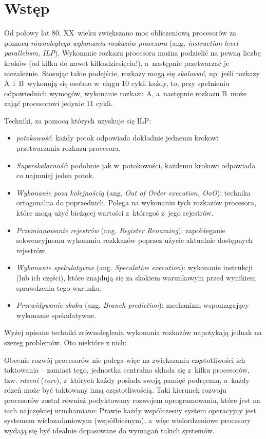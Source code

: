 \section{Wstęp}
%
\indent 
	Od połowy lat 80. XX~wieku zwiększano moc obliczeniową procesorów za pomocą \emph{równoległego wykonania rozkazów procesora}
	(ang. \emph{instruction-level parallelism, ILP}). Wykonanie rozkazu procesora można podzielić na pewną liczbę kroków
	(od kilku do nawet kilkudziesięciu!),	a~następnie przetwarzać je niezależnie. 
	Stosując takie podejście, rozkazy mogą się \emph{skalować}, np. jeśli rozkazy A~i~B~wykonują się osobno w~ciągu 10 cykli każdy, to,
	przy spełnieniu odpowiednich wymogów, wykonanie rozkazu A, a~następnie rozkazu B~może zająć procesorowi jedynie 11 cykli.
\par
%
\indent
	Techniki, za pomocą których uzyskuje się ILP:
	\begin{itemize}
	\item \emph{potokowość}: każdy potok odpowiada dokładnie jednemu krokowi przetwarzania rozkazu procesora.
	\item \emph{Superskalarność}: podobnie jak w~potokowości, każdemu krokowi odpowiada co najmniej jeden potok.
	\item \emph{Wykonanie poza kolejnością} (ang. \emph{Out of Order execution, OoO}): technika ortogonalna do poprzednich. Polega na 
		wykonaniu tych rozkazów procesora, które mogą użyć bieżącej wartości z~któregoś z~jego rejestrów.
	\item \emph{Przemianowanie rejestrów} (ang. \emph{Register Renaming}): zapobieganie sekwencyjnemu wykonaniu rozkkazów poprzez użycie 
		aktualnie dostępnych rejestrów.
	\item \emph{Wykonanie spekulatywne} (ang. \emph{Speculative execution}): wykonanie instrukcji (lub ich części), które znajdują się
		za skokiem warunkowym przed wynikiem sprawdzenia tego warunku.
	\item \emph{Przewidywanie skoku} (ang. \emph{Branch prediction}): mechanizm wspomagający wykonanie spekulatywne.
	\end{itemize}
\par
%
\indent
	Wyżej opisane techniki zrównoleglenia wykonania rozkazów napotykają jednak na szereg problemów. Oto niektóre z nich:
\par
%
\indent
	Obecnie rozwój procesorów nie polega więc na zwiększaniu częstotliwości ich taktowania -- zamiast tego, jednostka centralna
	składa się z~kilku procesorów, tzw. \emph{rdzeni} (\emph{core}), z~których każdy posiada swoją pamięć podręczną, a~każdy
	rdzeń może być taktowany inną częstotliwością.
	Taki kierunek rozwoju procesorów został również podyktowany rozwojem oprogramowania, które jest na nich najczęściej uruchamiane:
	Prawie każdy współczesny system operacyjny jest systemem wielozadaniowym (współbieżnym), a~więc wielordzeniowe procesory wydają się
	być idealnie dopasowane do wymagań takich systemów.
\par
%
